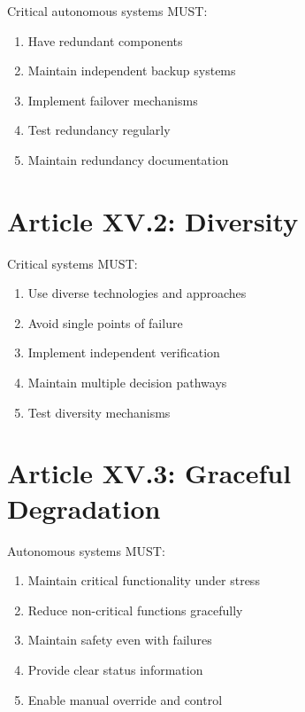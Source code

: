 \begin{articlebox}
Critical autonomous systems MUST:
\begin{enumerate}
    \item Have redundant components
    \item Maintain independent backup systems
    \item Implement failover mechanisms
    \item Test redundancy regularly
    \item Maintain redundancy documentation
\end{enumerate}
\end{articlebox}

\vspace{0.5cm}

\section{Article XV.2: Diversity}

\begin{articlebox}
Critical systems MUST:
\begin{enumerate}
    \item Use diverse technologies and approaches
    \item Avoid single points of failure
    \item Implement independent verification
    \item Maintain multiple decision pathways
    \item Test diversity mechanisms
\end{enumerate}
\end{articlebox}

\vspace{0.5cm}

\section{Article XV.3: Graceful Degradation}

\begin{articlebox}
Autonomous systems MUST:
\begin{enumerate}
    \item Maintain critical functionality under stress
    \item Reduce non-critical functions gracefully
    \item Maintain safety even with failures
    \item Provide clear status information
    \item Enable manual override and control
\end{enumerate}
\end{articlebox}

